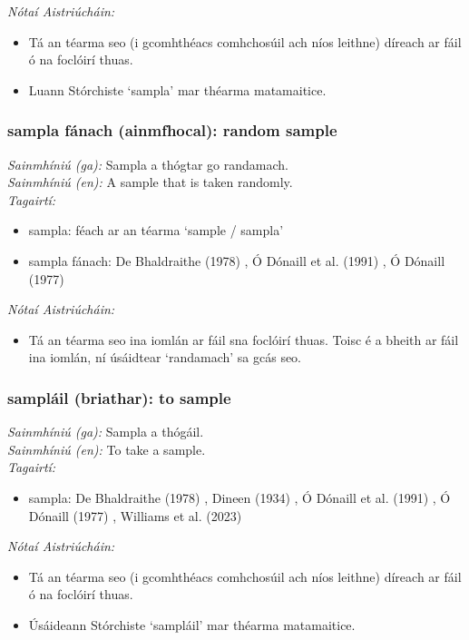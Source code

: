  \noindent \textit{Nótaí Aistriúcháin:}
\begin{itemize}
	\item Tá an téarma seo (i gcomhthéacs comhchosúil ach níos leithne) díreach ar fáil ó na foclóirí thuas.
	\item Luann Stórchiste `sampla' mar théarma matamaitice.
\end{itemize}


\subsubsection*{sampla fánach (ainmfhocal): random sample}
 \noindent \textit{Sainmhíniú (ga):} Sampla a thógtar go randamach.
\\
 \noindent \textit{Sainmhíniú (en):} A sample that is taken randomly.
\\
 \noindent \textit{Tagairtí:}
\begin{itemize}
	\item sampla: féach ar an téarma `sample / sampla'
	\item sampla fánach: De Bhaldraithe (1978) \cite{de-bhaldraithe}, Ó Dónaill et al. (1991) \cite{focloir-beag}, Ó Dónaill (1977) \cite{odonaill}
\end{itemize}

 \noindent \textit{Nótaí Aistriúcháin:}
\begin{itemize}
	\item Tá an téarma seo ina iomlán ar fáil sna foclóirí thuas. Toisc é a bheith ar fáil ina iomlán, ní úsáidtear `randamach' sa gcás seo.
\end{itemize}


\subsubsection*{sampláil (briathar): to sample}
 \noindent \textit{Sainmhíniú (ga):} Sampla a thógáil.
\\
 \noindent \textit{Sainmhíniú (en):} To take a sample.
\\
 \noindent \textit{Tagairtí:}
\begin{itemize}
	\item sampla: De Bhaldraithe (1978) \cite{de-bhaldraithe}, Dineen (1934) \cite{dineen}, Ó Dónaill et al. (1991) \cite{focloir-beag}, Ó Dónaill (1977) \cite{odonaill}, Williams et al. (2023) \cite{storchiste}
\end{itemize}

 \noindent \textit{Nótaí Aistriúcháin:}
\begin{itemize}
	\item Tá an téarma seo (i gcomhthéacs comhchosúil ach níos leithne) díreach ar fáil ó na foclóirí thuas.
	\item Úsáideann Stórchiste `sampláil' mar théarma matamaitice.
\end{itemize}


